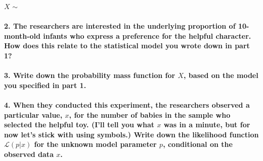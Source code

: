 \documentclass[]{article}
\let\oldparagraph\paragraph
\renewcommand{\paragraph}[1]{\oldparagraph{#1}\mbox{}}
\begin{document}
\vspace{0.5cm}

\(X\) \(\sim \,\)

\paragraph{2. The researchers are interested in the underlying
proportion of 10-month-old infants who express a preference for the
helpful character. How does this relate to the statistical model you
wrote down in part
1?}\label{the-researchers-are-interested-in-the-underlying-proportion-of-10-month-old-infants-who-express-a-preference-for-the-helpful-character.-how-does-this-relate-to-the-statistical-model-you-wrote-down-in-part-1}

\newpage

\paragraph{\texorpdfstring{3. Write down the probability mass function
for \(X\), based on the model you specified in part
1.}{3. Write down the probability mass function for X, based on the model you specified in part 1.}}\label{write-down-the-probability-mass-function-for-x-based-on-the-model-you-specified-in-part-1.}

\vspace{3cm}

\paragraph{\texorpdfstring{4. When they conducted this experiment, the
researchers observed a particular value, \(x\), for the number of babies
in the sample who selected the helpful toy. (I'll tell you what \(x\)
was in a minute, but for now let's stick with using symbols.) Write down
the likelihood function \(\mathcal{L}(p | x)\) for the unknown model
parameter \(p\), conditional on the observed data
\(x\).}{4. When they conducted this experiment, the researchers observed a particular value, x, for the number of babies in the sample who selected the helpful toy. (I'll tell you what x was in a minute, but for now let's stick with using symbols.) Write down the likelihood function \textbackslash{}mathcal\{L\}(p \textbar{} x) for the unknown model parameter p, conditional on the observed data x.}}\label{when-they-conducted-this-experiment-the-researchers-observed-a-particular-value-x-for-the-number-of-babies-in-the-sample-who-selected-the-helpful-toy.-ill-tell-you-what-x-was-in-a-minute-but-for-now-lets-stick-with-using-symbols.-write-down-the-likelihood-function-mathcallp-x-for-the-unknown-model-parameter-p-conditional-on-the-observed-data-x.}
\end{document}
